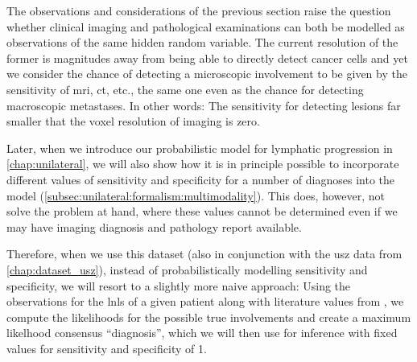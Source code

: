 \documentclass[\relativeRoot/main.tex]{subfiles}
\begin{document}
The observations and considerations of the previous section raise the question whether clinical imaging and pathological examinations can both be modelled as observations of the same hidden random variable. The current resolution of the former is magnitudes away from being able to directly detect cancer cells and yet we consider the chance of detecting a microscopic involvement to be given by the sensitivity of \gls{mri}, \gls{ct}, etc., the same one even as the chance for detecting macroscopic metastases. In other words: The sensitivity for detecting lesions far smaller that the voxel resolution of imaging is zero.

Later, when we introduce our probabilistic model for lymphatic progression in \cref{chap:unilateral}, we will also show how it is in principle possible to incorporate different values of sensitivity and specificity for a number of diagnoses into the model (\cref{subsec:unilateral:formalism:multimodality}). This does, however, not solve the problem at hand, where these values cannot be determined even if we may have imaging diagnosis and pathology report available.

Therefore, when we use this dataset (also in conjunction with the \gls{usz} data from \cref{chap:dataset_usz}), instead of probabilistically modelling sensitivity and specificity, we will resort to a slightly more naive approach: Using the observations for the \glspl{lnl} of a given patient along with literature values from , we compute the likelihoods for the possible true involvements and create a maximum likelhood consensus ``diagnosis'', which we will then use for inference with fixed values for sensitivity and specificity of 1.
\end{document}
